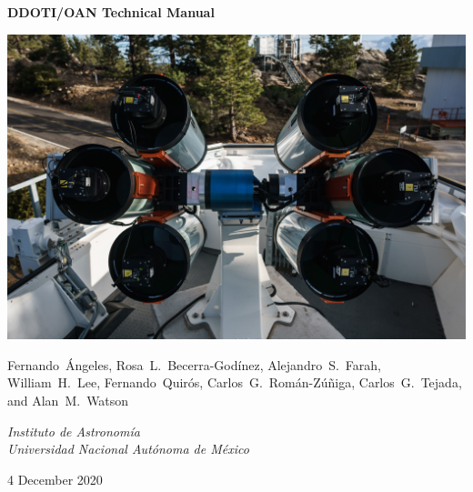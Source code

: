 \begin{centering}
{
 \Large
 \bfseries 
 DDOTI/OAN Technical Manual
 \par
}
\bigskip
\bigskip
\includegraphics[width=\linewidth]{figures/frontmatter-ddotioan.jpg}

\bigskip
\bigskip
{
\baselineskip=10pt
 \large
 Fernando~Ángeles,
 Rosa~L.~Becerra-Godínez,
 Alejandro~S.~Farah,
 William~H.~Lee,
 Fernando~Quirós,
 Carlos~G.~Román-Zúñiga,
 Carlos~G.~Tejada,
 and
 Alan~M.~Watson
 \par
}
\bigskip
{
 \large
 \itshape 
 Instituto de Astronomía\\
 Universidad Nacional Autónoma de México
 \par
}
\bigskip
{
 \large
 4 December 2020
}
\fi

\end{centering}

\newpage

\pagestyle{plain}


\tableofcontents

